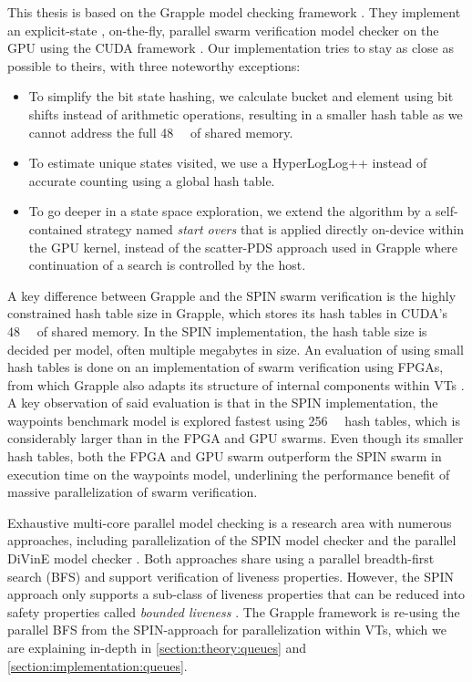 \documentclass[
fancyheadings, %
%
%
]{stsreprt}
\begin{document}
This thesis is based on the Grapple model checking framework \cite{DeFrancisco2020.Grapple}.
They implement an explicit-state \cite{Holzmann2018.Explicit-State-Model-Checking}, on-the-fly, parallel swarm verification model checker on the GPU using the CUDA framework \cite{CUDA-Programming-Guide}.
Our implementation tries to stay as close as possible to theirs, with three noteworthy exceptions:

\begin{itemize}
    \item To simplify the bit state hashing, we calculate bucket and element using bit shifts instead of arithmetic operations, resulting in a smaller hash table as we cannot address the full \SI{48}{\kibi\byte} of shared memory.
    \item To estimate unique states visited, we use a HyperLogLog++ instead of accurate counting using a global hash table.
    \item To go deeper in a state space exploration, we extend the algorithm by a self-contained strategy named \emph{start overs} that is applied directly on-device within the GPU kernel, instead of the scatter-PDS approach used in Grapple where continuation of a search is controlled by the host.
\end{itemize}

A key difference between Grapple and the SPIN swarm verification is the highly constrained hash table size in Grapple, which stores its hash tables in CUDA's \SI{48}{\kibi\byte} of shared memory.
In the SPIN implementation, the hash table size is decided per model, often multiple megabytes in size.
An evaluation of using small hash tables is done on an implementation of swarm verification using FPGAs, from which Grapple also adapts its structure of internal components within VTs \cite{Cho2018}.
A key observation of said evaluation is that in the SPIN implementation, the waypoints benchmark model is explored fastest using \SI{256}{\mega\byte} hash tables, which is considerably larger than in the FPGA and GPU swarms.
Even though its smaller hash tables, both the FPGA and GPU swarm outperform the SPIN swarm in execution time on the waypoints model, underlining the performance benefit of massive parallelization of swarm verification.

Exhaustive multi-core parallel model checking is a research area with numerous approaches, including parallelization of the SPIN model checker \cite{Holzmann2004} and the parallel DiVinE model checker \cite{Barnat2008, Barnat2007}.
Both approaches share using a parallel breadth-first search (BFS) and support verification of liveness properties.
However, the SPIN approach only supports a sub-class of liveness properties that can be reduced into safety properties called \emph{bounded liveness} \cite{Holzmann2012.Paralellizing-SPIN}.
The Grapple framework is re-using the parallel BFS from the SPIN-approach for parallelization within VTs, which we are explaining in-depth in \cref{section:theory:queues} and \cref{section:implementation:queues}.
\end{document}
